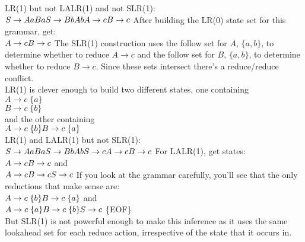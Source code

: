 \documentclass[12pt]{article}
\begin{document}
\noindent
LR(1) but not LALR(1) and not SLR(1):\\
$ S \rightarrow AaBa\\
S \rightarrow BbAb\\
A \rightarrow c\\
B \rightarrow c\\
$ After building the LR(0) state set for this grammar, get:\\
$A \rightarrow c\\
B \rightarrow c\\
$ The SLR(1) construction uses the follow set for $A$, $\{a,b\}$, to determine whether to reduce $A \rightarrow c$ and the follow set for $B$, $\{a, b\}$, to determine whether to reduce $B\rightarrow c$. Since these sets intersect there's a reduce/reduce conflict. \\
LR(1) is clever enough to build two different states, one containing\\
$A \rightarrow c \;\{a\}$\\
$B \rightarrow c \;\{b\}$\\
and the other containing \\
$A \rightarrow c \;\{b\}\\
B \rightarrow c \;\{a\}$\\

\noindent
LR(1) and LALR(1) but not SLR(1):\\
$S \rightarrow AaBa\\
S \rightarrow BbAb\\
S\rightarrow c\\
A \rightarrow c\\
B \rightarrow c\\$
For LALR(1), get states:\\
$A\rightarrow c\\
B \rightarrow c\\$
and\\
$A\rightarrow c\\
B\rightarrow c\\
S\rightarrow c\\$
If you look at the grammar carefully, you'll see that the only reductions that make sense are:\\
$A\rightarrow c \;\{b\}\\
B \rightarrow c \;\{a\}\\$
and \\
$A\rightarrow c \;\{a\}\\
B \rightarrow c\;\{b\}\\
S \rightarrow c$ \{EOF\}\\
But SLR(1) is not powerful enough to make this inference as it uses the same lookahead set for each reduce action, irrespective of the state that it occurs in.
\end{document}
